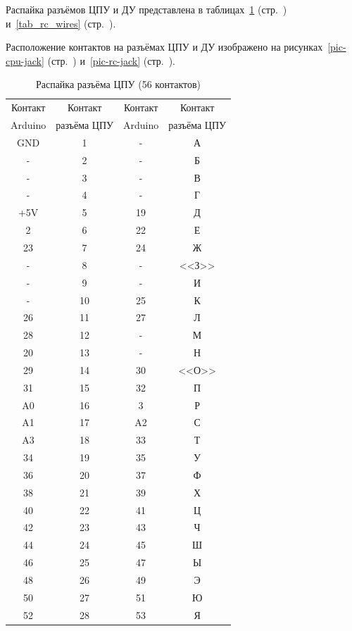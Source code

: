\documentclass[12pt, a4paper]{article}
\begin{document}
Распайка разъёмов ЦПУ и ДУ представлена в таблицах~\ref{tab_cpu_wires} (стр.~\pageref{tab_cpu_wires}) и~\ref{tab_rc_wires} (стр.~\pageref{tab_rc_wires}).

Расположение контактов на разъёмах ЦПУ и ДУ изображено на рисунках~\ref{pic-cpu-jack} (стр.~\pageref{pic-cpu-jack}) и~\ref{pic-rc-jack} (стр.~\pageref{pic-rc-jack}).

\begin{table}
\begin{center}
\caption{Распайка разъёма ЦПУ (56 контактов)}
\begin{tabular}{cccc}
\hline \hline
Контакт & Контакт & Контакт & Контакт \\
Arduino & разъёма ЦПУ & Arduino & разъёма ЦПУ \\
\hline
GND & 1 & - & А \\
- & 2 & - & Б \\
- & 3 & - & В \\
- & 4 & - & Г \\
+5V & 5 & 19 & Д \\
2 & 6 & 22 & Е \\
23 & 7 & 24 & Ж \\
- & 8 & - & <<З>> \\
- & 9 & - & И \\
- & 10 & 25 & К \\
26 & 11 & 27 & Л \\
28 & 12 & - & М \\
20 & 13 & - & Н \\
29 & 14 & 30 & <<О>> \\
31 & 15 & 32 & П \\
A0 & 16 & 3 & Р \\
A1 & 17 & A2 & С \\
A3 & 18 & 33 & Т \\
34 & 19 & 35 & У \\
36 & 20 & 37 & Ф \\
38 & 21 & 39 & Х \\
40 & 22 & 41 & Ц \\
42 & 23 & 43 & Ч \\
44 & 24 & 45 & Ш \\
46 & 25 & 47 & Ы \\
48 & 26 & 49 & Э \\
50 & 27 & 51 & Ю \\
52 & 28 & 53 & Я \\
\hline \hline
\end{tabular}
\label{tab_cpu_wires}
\end{center}
\end{table}
\end{document}
